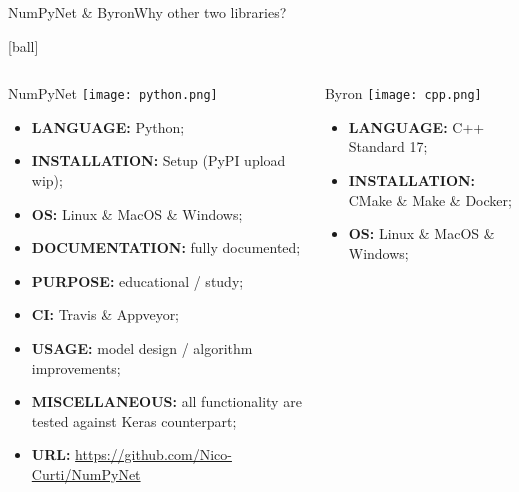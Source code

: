 \documentclass{standalone}
\begin{document}
\begin{frame}{NumPyNet \& Byron}{Why other two libraries?}



  [ball]

  \begin{columns}

    \begin{column}{0.5\textwidth}
      \begin{block}{NumPyNet \hfill\texttt{[image: python.png]}}
        \begin{itemize}
          \item \textbf{LANGUAGE:} \textsf{Python};
          \item \textbf{INSTALLATION:} \textsf{Setup} (\textsf{PyPI} upload wip);
          \item \textbf{OS:} Linux \& MacOS \& Windows;
          \item \textbf{DOCUMENTATION:} fully documented;
          \item \textbf{PURPOSE:} educational / study;
          \item \textbf{CI:} Travis \& Appveyor;
          \item \textbf{USAGE:} model design / algorithm improvements;
          \item \textbf{MISCELLANEOUS:} all functionality are tested against \textsf{Keras} counterpart;
          \item \textbf{URL:} \url{https://github.com/Nico-Curti/NumPyNet}
        \end{itemize}
      \end{block}
    \end{column}
    \begin{column}{0.5\textwidth}
      \begin{alertblock}{Byron \hfill\texttt{[image: cpp.png]}}
        \begin{itemize}
          \item \textbf{LANGUAGE:} \textsf{C++} Standard 17;
          \item \textbf{INSTALLATION:} \textsf{CMake} \& \textsf{Make} \& \textsf{Docker};
          \item \textbf{OS:} Linux \& MacOS \& Windows;

\end{itemize}
\end{alertblock}
\end{column}
\end{columns}
\end{frame}
\end{document}
